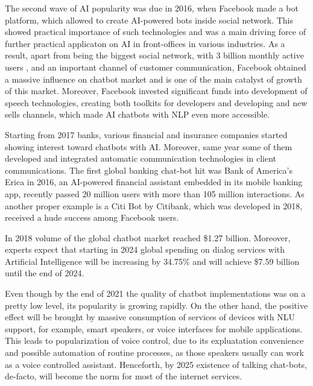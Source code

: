 The second wave of AI popularity was due in 2016, when Facebook made a bot platform, which allowed to create AI-powered bots inside social network.
This showed practical importance of such technologies and was a main driving force of further practical applicaton on AI in front-offices in various industries.
As a result, apart from being the biggest social network, with 3 billion monthly active users \cite{facebook_statistic}, and an important channel of customer communication, Facebook obtained a massive influence on chatbot market and is one of the main catalyst of growth of this market.
Moreover, Facebook invested significant funds into development of speech technologies, creating both toolkits for developers and developing and new sells channels, which made AI chatbots with NLP even more accessible.

Starting from 2017 banks, various financial and insurance companies started showing interest toward chatbots with AI.
Moreover, same year some of them developed and integrated automatic communication technologies in client communications.
The first global banking chat-bot hit was Bank of America's Erica in 2016, an AI-powered financial assistant embedded in its mobile banking app, recently passed 20 million users with more than 105 million interactions.
As another proper example is a Citi Bot by Citibank, which was developed in 2018, received a hude success among Facebook users.

In 2018 volume of the global chatbot market reached \$1.27 billion.
Moreover, experts expect that starting in 2024 global spending on dialog services with Artificial Intelligence will be increasing by 34.75\% and will achieve \$7.59 billion until the end of 2024.
\cite{gartner_chat_bots}

Even though by the end of 2021 the quality of chatbot implementations was on a pretty low level, its popularity is growing rapidly.
On the other hand, the positive effect will be brought by massive consumption of services of devices with NLU support, for example, smart speakers, or voice interfaces for mobile applications.
This leads to popularization of voice control, due to its expluatation convenience and possible automation of routine processes, as those speakers usually can work as a voice controlled assistant.
Henceforth, by 2025 existence of talking chat-bots, de-facto, will become the norm for most of the internet services.
\cite{accenture_chatbots}

